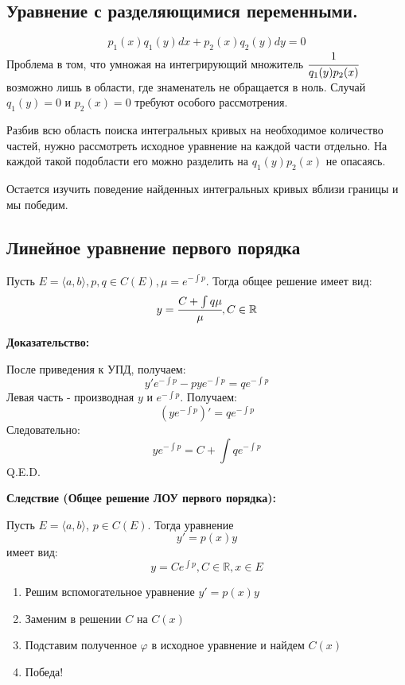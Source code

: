 \subsection{Уравнение с разделяющимися переменными.}

$$p_1(x)q_1(y)dx + p_2(x) q_2(y)dy = 0$$
Проблема в том, что умножая на интегрирующий множитель $\cfrac{1}{q_1(y)p_2(x)}$ возможно лишь в области, где знаменатель не обращается в ноль. Случай $q_1(y) =0$ и $p_2(x) =0$ требуют особого рассмотрения.

Разбив всю область поиска интегральных кривых на необходимое количество частей, нужно рассмотреть исходное уравнение на каждой части отдельно. На каждой такой подобласти его можно разделить на $q_1(y)p_2(x)$ не опасаясь.

Остается изучить поведение найденных интегральных кривых вблизи границы и мы победим.

\subsection{Линейное уравнение первого порядка}


Пусть $E = \langle a,b\rangle,p,q\in C(E), \mu = e^{-\int p}$. Тогда общее решение имеет вид:
$$y = \cfrac{C+ \int q\mu}{\mu}, C \in \mathbb{R}$$

\textbf{Доказательство:}

После приведения к УПД, получаем:
$$y'e^{-\int p}-p y e^{- \int p}= qe^{-\int p}$$
Левая часть - производная $y$ и $e^{-\int p}$. Получаем:
$$(y e^{-\int p})' = q e^{-\int p} $$
Следовательно:
$$ye^{-\int p} = C + \int qe^{-\int p}$$
\hfill Q.E.D.


\textbf{Следствие (Общее решение ЛОУ первого порядка):}

Пусть $E = \langle a,b \rangle$, $p \in C(E)$. Тогда уравнение $$y'=p(x)y$$
имеет вид:
$$y = C e^{\int p}, C\in \mathbb{R}, x\in E$$


\begin{enumerate}
    \item Решим вспомогательное уравнение $y' = p(x)y$
    \item Заменим в решении $C$ на $C(x)$
    \item Подставим полученное $\varphi$ в исходное уравнение и найдем $C(x)$
    \item Победа!
\end{enumerate}

